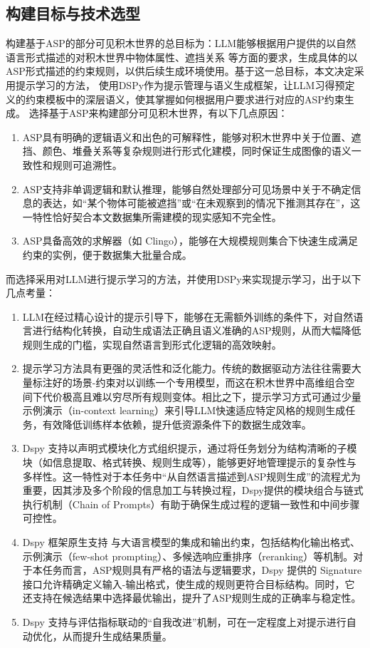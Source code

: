 \subsection{构建目标与技术选型}
构建基于ASP的部分可见积木世界的总目标为：LLM能够根据用户提供的以自然语言形式描述的对积木世界中物体属性、遮挡关系
等方面的要求，生成具体的以ASP形式描述的约束规则，以供后续生成环境使用。基于这一总目标，本文决定采用提示学习的方法，
使用DSPy作为提示管理与语义生成框架，让LLM习得预定义的约束模板中的深层语义，使其掌握如何根据用户要求进行对应的ASP约束生成。
选择基于ASP来构建部分可见积木世界，有以下几点原因：
\begin{enumerate}[nosep]
\item ASP具有明确的逻辑语义和出色的可解释性，能够对积木世界中关于位置、遮挡、颜色、堆叠关系等复杂规则进行形式化建模，同时保证生成图像的语义一致性和规则可追溯性。
\item ASP支持非单调逻辑和默认推理，能够自然处理部分可见场景中关于不确定信息的表达，如“某个物体可能被遮挡”或“在未观察到的情况下推测其存在”，这一特性恰好契合本文数据集所需建模的现实感知不完全性。
\item ASP具备高效的求解器（如 Clingo），能够在大规模规则集合下快速生成满足约束的实例，便于数据集大批量合成。
\end{enumerate}
而选择采用对LLM进行提示学习的方法，并使用DSPy来实现提示学习，出于以下几点考量：
\begin{enumerate}[nosep]
\item LLM在经过精心设计的提示引导下，能够在无需额外训练的条件下，对自然语言进行结构化转换，自动生成语法正确且语义准确的ASP规则，从而大幅降低规则生成的门槛，实现自然语言到形式化逻辑的高效映射。
\item 提示学习方法具有更强的灵活性和泛化能力。传统的数据驱动方法往往需要大量标注好的场景-约束对以训练一个专用模型，而这在积木世界中高维组合空间下代价极高且难以穷尽所有规则变体。相比之下，提示学习方式可通过少量示例演示（in-context learning）来引导LLM快速适应特定风格的规则生成任务，有效降低训练样本依赖，提升低资源条件下的数据生成效率。
\item Dspy 支持以声明式模块化方式组织提示，通过将任务划分为结构清晰的子模块（如信息提取、格式转换、规则生成等），能够更好地管理提示的复杂性与多样性。这一特性对于本任务中“从自然语言描述到ASP规则生成”的流程尤为重要，因其涉及多个阶段的信息加工与转换过程，Dspy提供的模块组合与链式执行机制（Chain of Prompts）有助于确保生成过程的逻辑一致性和中间步骤可控性。
\item Dspy 框架原生支持 与大语言模型的集成和输出约束，包括结构化输出格式、示例演示（few-shot prompting）、多候选响应重排序（reranking）等机制。对于本任务而言，ASP规则具有严格的语法与逻辑要求，Dspy 提供的 Signature 接口允许精确定义输入-输出格式，使生成的规则更符合目标结构。同时，它还支持在候选结果中选择最优输出，提升了ASP规则生成的正确率与稳定性。
\item Dspy 支持与评估指标联动的“自我改进”机制，可在一定程度上对提示进行自动优化，从而提升生成结果质量。
\end{enumerate}

